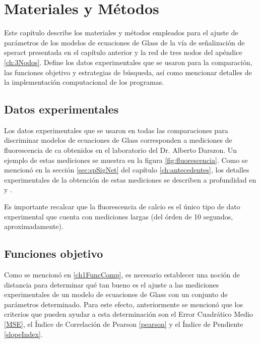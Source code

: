 \chapter{Materiales y M\'etodos}\label{ch:matmet}

Este capítulo describe los materiales y métodos empleados para el ajuste de parámetros de los modelos de ecuaciones de Glass de la vía de señalización de speract presentada en el capítulo anterior y la red de tres nodos del apéndice \ref{ch:3Nodos}. Define los datos experimentales que se usaron para la comparación, las funciones objetivo y estrategias de búsqueda, así como mencionar detalles de la implementación computacional de los programas.

\section{Datos experimentales}
Los datos experimentales que se usaron en todas las comparaciones para discriminar modelos de ecuaciones de Glass corresponden a mediciones de fluorescencia de \ac{ca} obtenidos en el laboratorio del Dr. Alberto Darszon. Un ejemplo de estas mediciones se muestra en la figura \ref{fig:fluorescencia}. Como se mencionó en la sección \ref{sec:spSigNet} del capítulo \ref{ch:antecedentes}, los detalles experimentales de la obtención de estas mediciones se describen a profundidad en \citeauthor{Darszon2008} \citep{Darszon2008} y \citeauthor{Wood2007} \citep{Wood2007}. 

Es importante recalcar que la fluorescencia de calcio es el único tipo de dato experimental que cuenta con mediciones largas (del órden de 10 segundos, aproximadamente).

\section{Funciones objetivo}\label{ch2funcObj}

Como se mencionó en \ref{ch1FuncComp}, es necesario establecer una noción de distancia para determinar qué tan bueno es el ajuste a las mediciones experimentales de un modelo de ecuaciones de Glass con un conjunto de parámetros determinado. Para este efecto, anteriormente se mencionó que los criterios que pueden ayudar a esta determinación son el Error Cuadrático Medio \ref{MSE}, el Índice de Correlación de Pearson \ref{pearson} y el Índice de Pendiente \ref{slopeIndex}.

